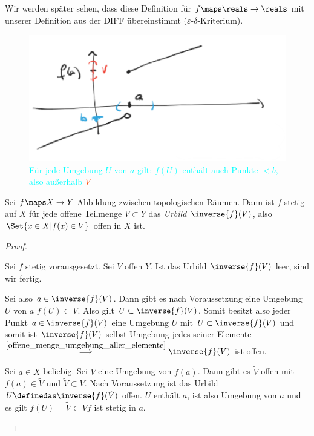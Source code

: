 \begin{bemerkung*}
    Wir werden später sehen, dass diese Definition für \( f\maps \reals\to\reals \) mit unserer Definition aus der DIFF  übereinstimmt (\( \varepsilon \)-\( \delta \)-Kriterium).
\end{bemerkung*}
\begin{figure}[H]
    \centering
    \includegraphics[width=0.6\linewidth]{figures/topologische_unstetigkeit_beispiel_aus_r}
    \caption*{\textcolor{Cyan}{Für jede Umgebung \( U \) von \( a \) gilt: \( f(U) \) enthält auch Punkte \( <b \), also außerhalb }\textcolor{OrangeRed}{\( V \)}}
    \label{fig:topologische_unstetigkeit_beispiel_aus_r}
\end{figure}
\begin{satz}\label{stetigkeit_in_topologischen_raeumen:urbildkriterium}
    Sei \( f\maps X\to Y \) Abbildung zwischen topologischen Räumen. 
    Dann ist \( f \) stetig auf \( X \) \gdw für jede offene Teilmenge \( V\subset Y \) das \emph{Urbild} \( \inverse{f}(V) \), also \( \Set{x\in X|f(x)\in V} \) offen in \( X \) ist.
\end{satz}
\begin{proof}
    \begin{proofdescription}
        
        \item[\hin] Sei \( f \) stetig vorausgesetzt.
        Sei \( V \) offen \( Y \). Ist das Urbild \( \inverse{f}(V) \) leer, sind wir fertig.
        
        Sei also \( a\in \inverse{f}(V) \). 
        Dann gibt es nach Voraussetzung eine Umgebung \( U \) von \( a \) \sd \( f(U)\subset V \). 
        Also gilt \( U \subset \inverse{f}(V)\). 
        Somit besitzt also jeder Punkt \( a\in \inverse{f}(V) \) eine Umgebung \( U \) mit \( U\subset \inverse{f}(V) \) und somit ist \( \inverse{f}(V) \) selbst Umgebung jedes seiner Elemente \( \overset{\ref{offene_menge_umgebung_aller_elemente}}{\implies} \inverse{f}(V)\) ist offen.

        
        \item[\rueck] Sei \( a\in X \) beliebig. Sei \( V \) eine Umgebung von \( f(a) \). Dann gibt es \( \tilde{V} \) offen mit \( f(a)\in \tilde{V} \) und \( \tilde{V}\subset V \). Nach Voraussetzung ist das Urbild \( U\definedas \inverse{f}(\tilde{V}) \) offen. \( U \) enthält \( a \), ist also Umgebung von \( a \) und es gilt \( f(U)=\tilde{V}\subset V \)\timplies \( f \) ist stetig in \( a \).
    \end{proofdescription}
    
\end{proof}
